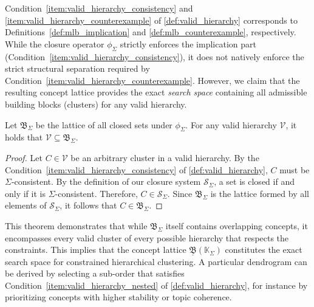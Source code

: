 Condition~\ref{item:valid_hierarchy_consistency} and \ref{item:valid_hierarchy_counterexample} of \eqref{def:valid_hierarchy} corresponds to Definitions~\eqref{def:mlb_implication} and \eqref{def:mlb_counterexample}, respectively. 
While the closure operator $\phi_\Sigma$ strictly enforces the implication part (Condition~\ref{item:valid_hierarchy_consistency}), it does not natively enforce the strict structural separation required by Condition~\ref{item:valid_hierarchy_counterexample}. However, we claim that the resulting concept lattice provides the exact \emph{search space} containing all admissible building blocks (clusters) for any valid hierarchy.

\begin{theorem}
Let $\mathfrak{B}_\Sigma$ be the lattice of all closed sets under $\phi_\Sigma$. For any valid hierarchy $\mathcal{V}$, it holds that $\mathcal{V} \subseteq \mathfrak{B}_\Sigma$.
\end{theorem}

\begin{proof}
Let $C \in \mathcal{V}$ be an arbitrary cluster in a valid hierarchy. By the Condition~\ref{item:valid_hierarchy_consistency} of \eqref{def:valid_hierarchy}, $C$ must be $\Sigma$-consistent. By the definition of our closure system $\mathcal{S}_\Sigma$, a set is closed if and only if it is $\Sigma$-consistent. Therefore, $C \in \mathcal{S}_\Sigma$. Since $\mathfrak{B}_\Sigma$ is the lattice formed by all elements of $\mathcal{S}_\Sigma$, it follows that $C \in \mathfrak{B}_\Sigma$.
\end{proof}

This theorem demonstrates that while $\mathfrak{B}_\Sigma$ itself contains overlapping concepts, it encompasses every valid cluster of every possible hierarchy that respects the constraints.
This implies that the concept lattice $\underline{\mathfrak{B}}(\mathbb{K}_{\Sigma})$ constitutes the exact search space for constrained hierarchical clustering. A particular dendrogram can be derived by selecting a sub-order that satisfies Condition~\ref{item:valid_hierarchy_nested} of \eqref{def:valid_hierarchy}, %
for instance by prioritizing concepts with higher stability or topic coherence.
